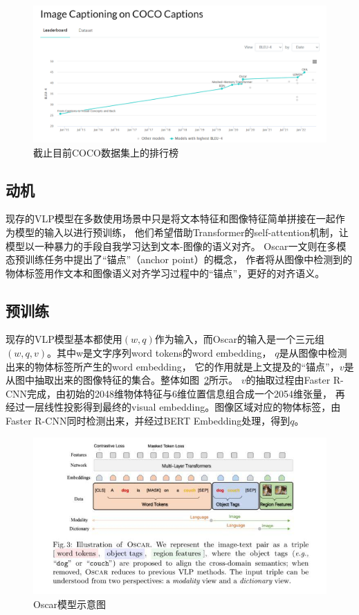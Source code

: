 \documentclass[UTF8]{ctexart}
\begin{document}
\begin{figure}
    \centering
    \includegraphics[width=\textwidth]{leader_board}
    \caption{截止目前COCO数据集上的排行榜}
    \label{fig:1}
\end{figure}

\subsection{动机}\label{subsec:motivation}
现存的VLP模型在多数使用场景中只是将文本特征和图像特征简单拼接在一起作为模型的输入以进行预训练，
他们希望借助Transformer的self-attention机制，让模型以一种暴力的手段自我学习达到文本-图像的语义对齐。
Oscar一文则在多模态预训练任务中提出了“锚点”（anchor point）的概念，
作者将从图像中检测到的物体标签用作文本和图像语义对齐学习过程中的“锚点”，更好的对齐语义。

\subsection{预训练}
现存的VLP模型基本都使用$(w, q)$作为输入，而Oscar的输入是一个三元组$(w, q, v)$。其中w是文字序列word tokens的word embedding，
$q$是从图像中检测出来的物体标签所产生的word embedding，
它的作用就是上文提及的“锚点”，$v$是从图中抽取出来的图像特征的集合。整体如图~\ref{fig:2}所示。
$v$的抽取过程由Faster R-CNN完成，由初始的2048维物体特征与6维位置信息组合成一个2054维张量，
再经过一层线性投影得到最终的visual embedding。图像区域对应的物体标签，由Faster R-CNN同时检测出来，并经过BERT Embedding处理，得到$q$。
\begin{figure}
    \centering
    \includegraphics[width=\textwidth]{oscar}
    \caption{Oscar模型示意图}
    \label{fig:2}
\end{figure}
\end{document}
